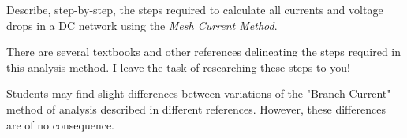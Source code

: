 

Describe, step-by-step, the steps required to calculate all currents and voltage drops in a DC network using the {\it Mesh Current Method}.







There are several textbooks and other references delineating the steps required in this analysis method.  I leave the task of researching these steps to you!







Students may find slight differences between variations of the "Branch Current" method of analysis described in different references.  However, these differences are of no consequence.



